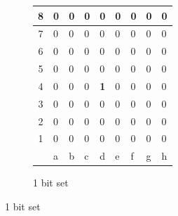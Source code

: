 \documentclass[12pt,a4paper,twoside,openright]{book}
\begin{document}
\begin{figure}[htpb]
\begin{subfigure}[b]{0.45\textwidth}
\centering
\begin{tabular}{|c|*{8}{>{\centering\arraybackslash}p{0.3cm}|}}
\hline
{\scriptsize 8} & \tiny 0 & \tiny 0 & \tiny 0 & \tiny 0 & \tiny 0 & \tiny 0 & \tiny 0 & \tiny 0 \\[2pt] \hline
{\scriptsize 7} & \tiny 0 & \tiny 0 & \tiny 0 & \tiny 0 & \tiny 0 & \tiny 0 & \tiny 0 & \tiny 0 \\[2pt] \hline
{\scriptsize 6} & \tiny 0 & \tiny 0 & \tiny 0 & \tiny 0 & \tiny 0 & \tiny 0 & \tiny 0 & \tiny 0 \\[2pt] \hline
{\scriptsize 5} & \tiny 0 & \tiny 0 & \tiny 0 & \tiny 0 & \tiny 0 & \tiny 0 & \tiny 0 & \tiny 0 \\[2pt] \hline
{\scriptsize 4} & \tiny 0 & \tiny 0 & \tiny 0 & \tiny\textbf{1} & \tiny 0 & \tiny 0 & \tiny 0 & \tiny 0 \\[2pt] \hline
{\scriptsize 3} & \tiny 0 & \tiny 0 & \tiny 0 & \cellcolor{lightgray}\tiny 0 & \tiny 0 & \tiny 0 & \tiny 0 & \tiny 0 \\[2pt] \hline
{\scriptsize 2} & \tiny 0 & \tiny 0 & \tiny 0 & \tiny 0 & \tiny 0 & \tiny 0 & \tiny 0 & \tiny 0 \\[2pt] \hline
{\scriptsize 1} & \tiny 0 & \tiny 0 & \tiny 0 & \tiny 0 & \tiny 0 & \tiny 0 & \tiny 0 & \tiny 0 \\[2pt] \hline
\multicolumn{1}{c|}{} & \scriptsize a & \scriptsize b & \scriptsize c & \scriptsize d & \scriptsize e & \scriptsize f & \scriptsize g & \scriptsize h \\
\cline{2-9}
\end{tabular}
\caption{1 bit set}
\end{subfigure}

\vspace{0.8cm}


\end{figure}
\end{document}
